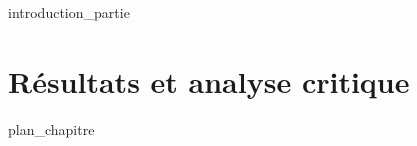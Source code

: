 \label{part:03_int}
{introduction_partie}
%
\chapter{Résultats et analyse critique}
\label{chap:09}
{plan_chapitre}
%
%
